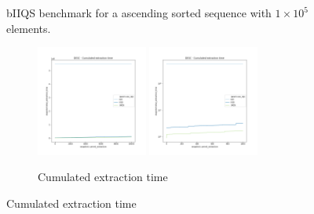 \begin{figure}
    \caption{bIIQS benchmark for a ascending sorted sequence with $1\times10^5$ elements.}
       \label{FIG:WORKHORSE_BENCHMARK_02}
\end{figure}



\begin{figure}

    \centering
    \begin{subfigure}[b]{\textwidth}
        \centering
        \includegraphics[width=0.40\textwidth]{./fragments/05_workhorse_experiment/images/01_basebenchmark_03_sort_d_case.png.0_0.png}
        \includegraphics[width=0.40\textwidth]{./fragments/05_workhorse_experiment/images/01_basebenchmark_03_sort_d_case.png.0_1.png}
        \caption{Cumulated extraction time}
        \label{FIG:WORKHORSE_BENCHMARK_03__0_0}
    \end{subfigure}


\end{figure}
